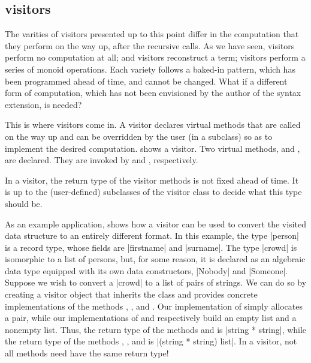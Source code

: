 \documentclass[11pt,a4paper,twoside]{article}
\begin{document}
\subsection{\fold visitors}
\label{sec:intro:fold}

The varities of visitors presented up to this point differ in the computation
that they perform on the way up, after the recursive calls. As we have seen,
\iter visitors perform no computation at all; \map and \mapendo visitors
reconstruct a term; \reduce visitors perform a series of monoid operations.
Each variety follows a baked-in pattern, which has been programmed ahead of
time, and cannot be changed. What if a different form of computation, which
has not been envisioned by the author of the \visitors syntax extension, is
needed?

This is where \fold visitors come in. A \fold visitor declares virtual methods
that are called on the way up and can be overridden by the user (in a
subclass) so as to implement the desired computation. 
shows a \fold visitor. Two virtual methods, 
and , are declared. They are invoked by
 and , respectively.

In a \fold visitor, the return type of the visitor methods is not fixed ahead
of time. It is up to the (user-defined) subclasses of the visitor class to
decide what this type should be.

As an example application,  shows how a \fold visitor can be
used to convert the visited data structure to an entirely different format. In
this example, the type \oc|person| is a record type, whose fields are
\oc|firstname| and \oc|surname|. The type \oc|crowd| is isomorphic to a list
of persons, but, for some reason, it is declared as an algebraic data type
equipped with its own data constructors, \oc|Nobody| and \oc|Someone|. Suppose
we wish to convert a \oc|crowd| to a list of pairs of strings. We can do so by
creating a visitor object that inherits the class \fold and provides concrete
implementations of the methods ,
, and .
Our implementation of  simply allocates
a pair, while our implementations of
 and 
respectively build an empty list and a nonempty list.
Thus, the return type of the methods 
and  is \oc|string * string|,
while the return type of the methods ,
, and  is
\oc|(string * string) list|. In a \fold visitor, not all methods
need have the same return type!
\end{document}

